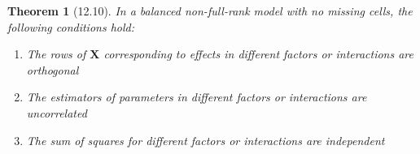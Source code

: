 \documentclass{article}
\newtheorem{theorem}{Theorem}[section]
\begin{document}
\begin{theorem}[12.10]
In a balanced non-full-rank model with no missing cells, the following conditions hold:
\begin{enumerate}[label=(\roman*)]
\item The rows of $\mathbf{X}$ corresponding to effects in different factors or interactions are orthogonal
\item The estimators of parameters in different factors or interactions are uncorrelated
\item The sum of squares for different factors or interactions are independent
\end{enumerate}
\end{theorem}
\end{document}
